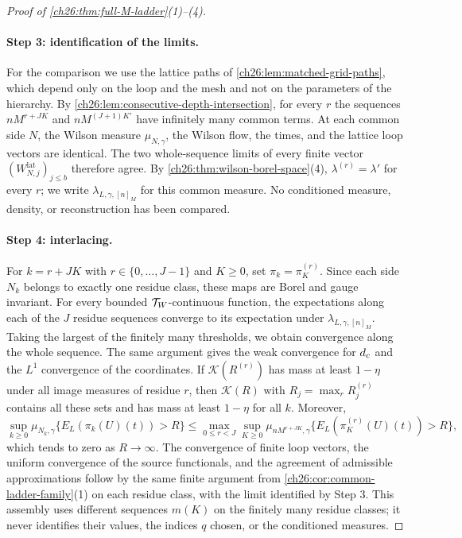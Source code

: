 \begin{proof}[Proof of \cref{ch26:thm:full-M-ladder}(1)--(4)]
\paragraph{Step 3: identification of the limits.}
For the comparison we use the lattice paths of \cref{ch26:lem:matched-grid-paths}, which depend only on the loop and the mesh and not on the parameters of the hierarchy. By \cref{ch26:lem:consecutive-depth-intersection}, for every $r$ the sequences $nM^{r+JK}$ and $nM^{(J+1)K'}$ have infinitely many common terms. At each common side $N$, the Wilson measure $\mu_{N,\gamma}$, the Wilson flow, the times, and the lattice loop vectors are identical. The two whole-sequence limits of every finite vector $(W^{\mathrm{lat}}_{N,j})_{j\le b}$ therefore agree. By \cref{ch26:thm:wilson-borel-space}(4), $\lambda^{(r)}=\lambda'$ for every $r$; we write $\lambda_{L,\gamma,[n]_M}$ for this common measure. No conditioned measure, density, or reconstruction has been compared.

\paragraph{Step 4: interlacing.}
For $k=r+JK$ with $r\in\{0,\dots,J-1\}$ and $K\ge0$, set $\pi_k=\pi^{(r)}_K$. Since each side $N_k$ belongs to exactly one residue class, these maps are Borel and gauge invariant. For every bounded $\mathcal T_W$-continuous function, the expectations along each of the $J$ residue sequences converge to its expectation under $\lambda_{L,\gamma,[n]_M}$. Taking the largest of the finitely many thresholds, we obtain convergence along the whole sequence. The same argument gives the weak convergence for $d_c$ and the $L^1$ convergence of the coordinates. If $\mathcal K(R^{(r)})$ has mass at least $1-\eta$ under all image measures of residue $r$, then $\mathcal K(R)$ with $R_j=\max_rR^{(r)}_j$ contains all these sets and has mass at least $1-\eta$ for all $k$. Moreover,
\[
 \sup_{k\ge0}\mu_{N_k,\gamma}\bigl\{E_L(\pi_k(U)(t))>R\bigr\}\le\max_{0\le r<J}\sup_{K\ge0}\mu_{nM^{r+JK},\gamma}\bigl\{E_L(\pi^{(r)}_K(U)(t))>R\bigr\},
\]
which tends to zero as $R\to\infty$. The convergence of finite loop vectors, the uniform convergence of the source functionals, and the agreement of admissible approximations follow by the same finite argument from \cref{ch26:cor:common-ladder-family}(1) on each residue class, with the limit identified by Step 3. This assembly uses different sequences $m(K)$ on the finitely many residue classes; it never identifies their values, the indices $q$ chosen, or the conditioned measures.


\end{proof}
